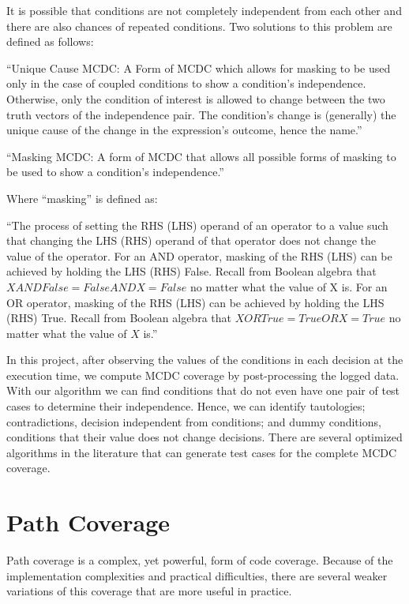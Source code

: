 \documentclass[12pt,a4paper]{report}
\begin{document}
It is possible that conditions are not completely independent from each other and there are also chances of repeated conditions. Two solutions to this problem are defined as follows:

``Unique Cause MCDC: A Form of MCDC which allows for masking to be used only in the case of coupled conditions to show a condition’s independence. Otherwise, only the condition of interest is allowed to change between the two truth vectors of the independence pair. The condition’s change is (generally) the unique cause of the change in the expression’s outcome, hence the name.''\cite{chilenski2001investigation}

``Masking MCDC: A form of MCDC that allows all possible forms of masking to be used to show a condition’s independence.''\cite{chilenski2001investigation}

Where ``masking'' is defined as:

``The process of setting the RHS (LHS) operand of an operator to a value such that changing the LHS (RHS) operand of that operator does not change the value of the operator. For an AND operator, masking of the RHS (LHS) can be achieved by holding the LHS (RHS) False.  Recall from Boolean algebra that $X AND False = False AND X = False$ no matter what the value of X is. For an OR operator, masking of the RHS (LHS) can be achieved by holding the LHS (RHS) True. Recall from Boolean algebra that $X OR True = True OR X = True$ no matter what the value of $X$ is.'' \cite{chilenski2001investigation}

In this project, after observing the values of the conditions in each decision at the execution time, we compute MCDC coverage by post-processing the logged data. With our algorithm we can find conditions that do not even have one pair of test cases to determine their independence. Hence, we can identify tautologies; contradictions, decision independent from conditions; and dummy conditions, conditions that their value does not change decisions. There are several optimized algorithms in the literature that can generate test cases for the complete MCDC coverage.

\section{Path Coverage}
Path coverage is a complex, yet powerful, form of code coverage. Because of the implementation complexities and practical difficulties, there are several weaker variations of this coverage that are more useful in practice. 
\end{document}
